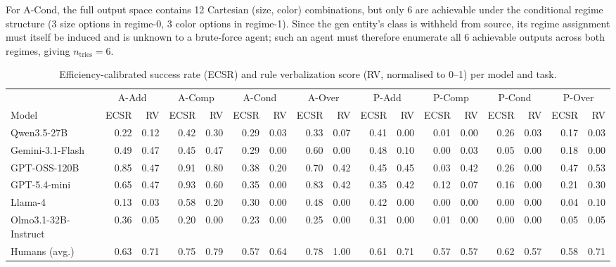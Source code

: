 \documentclass[11pt]{article}
\begin{document}
\noindent For A-Cond, the full output space contains 12 Cartesian (size, color) combinations, but only 6 are achievable under the conditional regime structure (3 size options in regime-0, 3 color options in regime-1).
Since the gen entity's class is withheld from source, its regime assignment must itself be induced and is unknown to a brute-force agent; such an agent must therefore enumerate all 6 achievable outputs across both regimes, giving $n_\text{tries}{=}6$.

\clearpage

\begin{table}[b]
  \centering
  \footnotesize
  \setlength{\tabcolsep}{2pt}
  \begin{tabular}{lrrrrrrrrrrrrrrrr}
  \toprule & \multicolumn{2}{c}{A-Add} & \multicolumn{2}{c}{A-Comp} & \multicolumn{2}{c}{A-Cond} & \multicolumn{2}{c}{A-Over} & \multicolumn{2}{c}{P-Add} & \multicolumn{2}{c}{P-Comp} & \multicolumn{2}{c}{P-Cond} & \multicolumn{2}{c}{P-Over} \\
  \cmidrule(lr){2-3} \cmidrule(lr){4-5} \cmidrule(lr){6-7} \cmidrule(lr){8-9} \cmidrule(lr){10-11} \cmidrule(lr){12-13} \cmidrule(lr){14-15} \cmidrule(lr){16-17}
   Model & ECSR & RV & ECSR & RV & ECSR & RV & ECSR & RV & ECSR & RV & ECSR & RV & ECSR & RV & ECSR & RV \\
  \midrule
  Qwen3.5-27B      & 0.22 & 0.12 & 0.42 & 0.30 & 0.29 & 0.03 & 0.33 & 0.07 & 0.41 & 0.00 & 0.01 & 0.00 & 0.26 & \cellcolor{gray!15}0.03 & 0.17 & 0.03 \\
  Gemini-3.1-Flash & 0.49 & \cellcolor{gray!15}0.47 & 0.45 & 0.47 & 0.29 & 0.00 & 0.60 & 0.00 & \cellcolor{gray!15}0.48 & 0.10 & 0.00 & 0.03 & 0.05 & 0.00 & 0.18 & 0.00 \\
  GPT-OSS-120B     & \cellcolor{gray!15}0.85 & \cellcolor{gray!15}0.47 & 0.91 & \cellcolor{gray!15}0.80 & \cellcolor{gray!15}0.38 & \cellcolor{gray!15}0.20 & 0.70 & \cellcolor{gray!15}0.42 & 0.45 & \cellcolor{gray!15}0.45 & 0.03 & \cellcolor{gray!15}0.42 & \cellcolor{gray!15}0.26 & 0.00 & \cellcolor{gray!15}0.47 & \cellcolor{gray!15}0.53 \\
  GPT-5.4-mini     & 0.65 & \cellcolor{gray!15}0.47 & \cellcolor{gray!15}0.93 & 0.60 & 0.35 & 0.00 & \cellcolor{gray!15}0.83 & \cellcolor{gray!15}0.42 & 0.35 & 0.42 & \cellcolor{gray!15}0.12 & 0.07 & 0.16 & 0.00 & 0.21 & 0.30 \\
  Llama-4          & 0.13 & 0.03 & 0.58 & 0.20 & 0.30 & 0.00 & 0.48 & 0.00 & 0.42 & 0.00 & 0.00 & 0.00 & 0.00 & 0.00 & 0.04 & 0.10 \\
  Olmo3.1-32B-Instruct & 0.36 & 0.05 & 0.20 & 0.00 & 0.23 & 0.00 & 0.25 & 0.00 & 0.31 & 0.00 & 0.01 & 0.00 & 0.00 & 0.00 & 0.05 & 0.05 \\
  \rowcolor{yellow!12}
  Humans (avg.)    & 0.63 & 0.71 & 0.75 & 0.79 & 0.57 & 0.64 & 0.78 & 1.00 & 0.61 & 0.71 & 0.57 & 0.57 & 0.62 & 0.57 & 0.58 & 0.71 \\
  \bottomrule
  \end{tabular}
  \caption{Efficiency-calibrated success rate (ECSR) and rule verbalization score (RV, normalised to 0--1) per model and task.}
  \label{tab:main_results}
\end{table}
\end{document}
